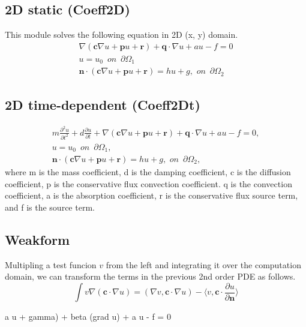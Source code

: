 \documentclass[11pt,a4paper,final]{report}
\begin{document}
\subsection{2D static (Coeff2D)}
This module solves the following equation in 2D (x, y) domain.
  \begin{align}
   \nabla (\mathbf{c} \nabla u + \mathbf{p}u + \mathbf{r}) + \mathbf{q} \cdot \nabla u + au - f = 0 
  \\  
  u = u_{0} \,\,\,on\,\,\,\partial \Omega_{1}
  \\
 \mathbf{n}\cdot (\mathbf{c} \nabla u + \mathbf{p}u + \mathbf{r}) = hu + g,\,\,on\,\,\,\partial \Omega_{2}
  \end{align}
  
 

 
  \subsection{2D time-dependent (Coeff2Dt)}
  \begin{align}
  m\frac{\partial^2 u}{\partial t^2} +   d\frac{\partial u}{\partial t} + \nabla (\mathbf{c} \nabla u + \mathbf{p}u + \mathbf{r}) + \mathbf{q} \cdot \nabla u + au - f = 0, 
  \\  
  u = u_{0} \,\,\,on\,\,\,\partial \Omega_{1},
  \\
 \mathbf{n}\cdot (\mathbf{c} \nabla u + \mathbf{p}u + \mathbf{r}) = hu + g,\,\,on\,\,\,\partial \Omega_{2},
  \end{align}
where m is the mass coefficient, d is the damping coefficient, c is the diffusion coefficient, p is the conservative flux convection coefficient. q is the convection coefficient,  a is the absorption coefficient, r is the conservative flux source term, and f is the source term.

 \subsection{Weakform}
  Multipling a test funcion $v$ from the left and integrating it over the computation domain,  we can transform the terms in the previous 2nd order PDE as follows.
  \begin{equation}
 \int v \nabla (\mathbf{c} \cdot \nabla u) = (\nabla v,\mathbf{c} \cdot \nabla u) - \langle v, \mathbf{c} \cdot \frac{\partial u}{\partial \mathbf{n}} \rangle
  \end{equation}
  
  a u + gamma) 
              + beta (grad u) + a u - f = 0
\end{document}

